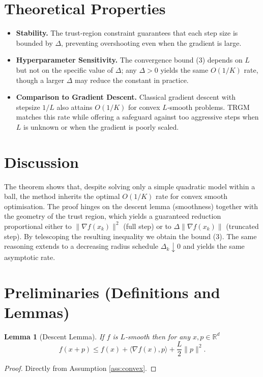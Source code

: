 \documentclass{article}
\newtheorem{lemma}{Lemma}
\newcommand{\R}{\mathbb{R}}
\begin{document}
\section*{Theoretical Properties}
\begin{itemize}[leftmargin=*]
\item \textbf{Stability.} The trust‑region constraint guarantees that each step size is bounded by $\Delta$, preventing overshooting even when the gradient is large.
\item \textbf{Hyperparameter Sensitivity.} The convergence bound (3) depends on $L$ but not on the specific value of $\Delta$; any $\Delta>0$ yields the same $O(1/K)$ rate, though a larger $\Delta$ may reduce the constant in practice.
\item \textbf{Comparison to Gradient Descent.} Classical gradient descent with stepsize $1/L$ also attains $O(1/K)$ for convex $L$‑smooth problems. TRGM matches this rate while offering a safeguard against too aggressive steps when $L$ is unknown or when the gradient is poorly scaled.
\end{itemize}

\section*{Discussion}
The theorem shows that, despite solving only a simple quadratic model within a ball, the method inherits the optimal $O(1/K)$ rate for convex smooth optimisation. The proof hinges on the descent lemma (smoothness) together with the geometry of the trust region, which yields a guaranteed reduction proportional either to $\|\nabla f(x_k)\|^{2}$ (full step) or to $\Delta\|\nabla f(x_k)\|$ (truncated step). By telescoping the resulting inequality we obtain the bound (3). The same reasoning extends to a decreasing radius schedule $\Delta_k\downarrow0$ and yields the same asymptotic rate.

\newpage
\section*{Preliminaries (Definitions and Lemmas)}
\begin{lemma}[Descent Lemma]\label{lem:descent}
If $f$ is $L$‑smooth then for any $x,p\in\R^{d}$
\[
f(x+p)\le f(x)+\langle\nabla f(x),p\rangle+\frac{L}{2}\|p\|^{2}.
\tag{L1}
\]
\end{lemma}
\begin{proof}
Directly from Assumption \ref{ass:convex}.
\end{proof}
\end{document}
